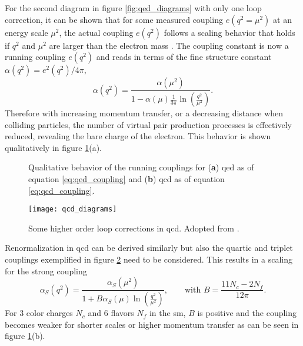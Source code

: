 For the second diagram in figure \ref{fig:qed_diagrams} with only one loop correction, it can be shown that for some measured coupling $e(q^2=\mu^2)$ at an energy scale $\mu^2$, the actual coupling $e(q^2)$ follows a scaling behavior that holds if $q^2$ and $\mu^2$ are larger than the electron mass \citep{thomson2013modern}. The coupling constant is now a running coupling $e(q^2)$ and reads in terms of the fine structure constant $\alpha(q^2)=e^2(q^2)/4\pi$,
\begin{equation}
    \alpha(q^2)=
    \frac{\alpha(\mu^2)}
    {1-\alpha(\mu)\frac{1}{3\pi}
        \ln
        \left(\frac{q^2}{\mu^2}\right)}.
    \label{eq:qed_coupling}
\end{equation}
Therefore with increasing momentum transfer, or a decreasing distance when colliding particles, the number of virtual pair production processes is effectively reduced, revealing the bare charge of the electron. This behavior is shown qualitatively in figure \ref{fig:renorm_scaling}(a).
\begin{figure}
    \centering
    \caption[]{Qualitative behavior of the running couplings for (\textbf{a}) \ac{qed} as of equation \ref{eq:qed_coupling} and (\textbf{b}) \ac{qcd} as of equation \ref{eq:qcd_coupling}.}
    \label{fig:renorm_scaling}
\end{figure}
\begin{figure}[H]
    \centering
    \texttt{[image: qcd\_diagrams]}
    \caption[]{Some higher order loop corrections in \ac{qcd}. Adopted from \citep{thomson2013modern}.}
    \label{fig:qcd_diagrams}
\end{figure}
Renormalization in \ac{qcd} can be derived similarly but also the quartic and triplet couplings exemplified in figure \ref{fig:qcd_diagrams} need to be considered. This results in a scaling for the strong coupling
\begin{equation}
    \alpha_S(q^2)=
    \frac{\alpha_S(\mu^2)}
    {1+B\alpha_S(\mu)
        \ln
        \left(\frac{q^2}{\mu^2}\right)}, \qquad \text{with } B=\frac{11N_c-2N_f}{12\pi}.
    \label{eq:qcd_coupling}
\end{equation}
For 3 color charges $N_c$ and 6 flavors $N_f$ in the \ac{sm}, $B$ is positive and the coupling becomes weaker for shorter scales or higher momentum transfer as can be seen in figure \ref{fig:renorm_scaling}(b).

